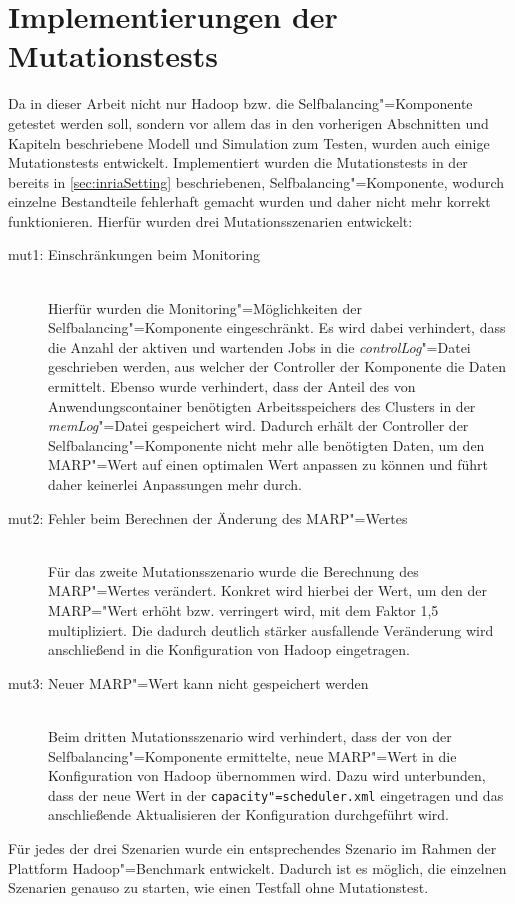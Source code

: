 \section{Implementierungen der Mutationstests}
\label{sec:implMutationTests}

Da in dieser Arbeit nicht nur Hadoop bzw. die Selfbalancing"=Komponente getestet werden soll, sondern vor allem das in den vorherigen Abschnitten und Kapiteln beschriebene Modell und Simulation zum Testen, wurden auch einige Mutationstests entwickelt.
Implementiert wurden die Mutationstests in der bereits in \autoref{sec:inriaSetting} beschriebenen, Selfbalancing"=Komponente, wodurch einzelne Bestandteile fehlerhaft gemacht wurden und daher nicht mehr korrekt funktionieren.
Hierfür wurden drei Mutationsszenarien entwickelt:

\begin{description}
    \item [mut1: Einschränkungen beim Monitoring] \hfill \\
        Hierfür wurden die Monitoring"=Möglichkeiten der Selfbalancing"=Komponente eingeschränkt.
        Es wird dabei verhindert, dass die Anzahl der aktiven und wartenden Jobs in die \emph{controlLog}"=Datei geschrieben werden, aus welcher der Controller der Komponente die Daten ermittelt.
        Ebenso wurde verhindert, dass der Anteil des von Anwendungscontainer benötigten Arbeitsspeichers des Clusters in der \emph{memLog}"=Datei gespeichert wird.
        Dadurch erhält der Controller der Selfbalancing"=Komponente nicht mehr alle benötigten Daten, um den \ac{MARP}"=Wert auf einen optimalen Wert anpassen zu können und führt daher keinerlei Anpassungen mehr durch.
    \item [mut2: Fehler beim Berechnen der Änderung des MARP"=Wertes] \hfill \\
        Für das zweite Mutationsszenario wurde die Berechnung des MARP"=Wertes verändert.
        Konkret wird hierbei der Wert, um den der MARP="Wert erhöht bzw. verringert wird, mit dem Faktor 1,5 multipliziert.
        Die dadurch deutlich stärker ausfallende Veränderung wird anschließend in die Konfiguration von Hadoop eingetragen.
    \item [mut3: Neuer MARP"=Wert kann nicht gespeichert werden] \hfill \\
        Beim dritten Mutationsszenario wird verhindert, dass der von der Selfbalancing"=Komponente ermittelte, neue MARP"=Wert in die Konfiguration von Hadoop übernommen wird.
        Dazu wird unterbunden, dass der neue Wert in der \texttt{capacity"=scheduler.xml} eingetragen und das anschließende Aktualisieren der Konfiguration durchgeführt wird.
\end{description}

Für jedes der drei Szenarien wurde ein entsprechendes Szenario im Rahmen der Plattform Hadoop"=Benchmark entwickelt.
Dadurch ist es möglich, die einzelnen Szenarien genauso zu starten, wie einen Testfall ohne Mutationstest.
